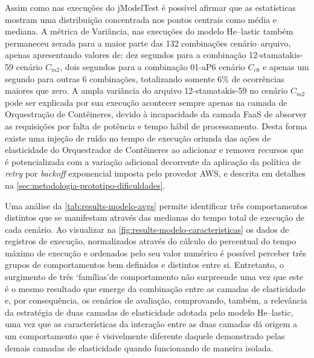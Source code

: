 \documentclass[english,brazilian]{UNISINOSmonografia} %
\begin{document}
Assim como nas execuções do jModelTest é possível afirmar que as estatísticas mostram uma distribuição concentrada nos pontos centrais como média e mediana.
%
A métrica de Variância, nas execuções do modelo \textsf{He}--lastic também permaneceu zerada para a maior parte das 132 combinações cenário--arquivo, apenas apresentando valores de: dez segundos para a combinação 12-stamatakis-59 cenário $C_{m2}$, dois segundos para a combinação 01-aP6 cenário $C_{c8}$ e apenas um segundo para outras 6 combinações, totalizando somente 6\% de ocorrências maiores que zero.
%
A ampla variância do arquivo 12-stamatakis-59 no cenário $C_{m2}$ pode ser explicada por sua execução acontecer sempre apenas na camada de Orquestração de Contêineres, devido à incapacidade da camada FaaS de absorver as requisições por falta de potência e tempo hábil de processamento.
%
Desta forma existe uma injeção de ruído no tempo de execução oriunda das ações de elasticidade do Orquestrador de Contêineres ao adicionar e remover recursos que é potencializada com a variação adicional decorrente da aplicação da política de \textit{retry} por \textit{backoff} exponencial imposta pelo provedor AWS, e descrita em detalhes na \autoref{sec:metodologia-prototipo-dificuldades}. 


Uma análise da \autoref{tab:results-modelo-avgs} permite identificar três comportamentos distintos que se manifestam através das medianas do tempo total de execução de cada cenário.
%
Ao visualizar na \autoref{fig:results-modelo-caracteristicas} os dados de registros de execução, normalizados através do cálculo do percentual do tempo máximo de execução e ordenados pelo seu valor numérico é possível perceber três grupos de comportamentos bem definidos e distintos entre si.
%
Entretanto, o surgimento de três \textquoteleft famílias\textquoteright de comportamento não surpreende uma vez que este é o mesmo resultado que emerge da combinação entre as camadas de elasticidade e, por consequência, os cenários de avaliação, comprovando, também, a relevância da estratégia de duas camadas de elasticidade adotada pelo modelo \textsf{He}--lastic, uma vez que as características da interação entre as duas camadas dá origem a um comportamento que é visivelmente diferente daquele demonstrado pelas demais camadas de elasticidade quando funcionando de maneira isolada.
\end{document}
